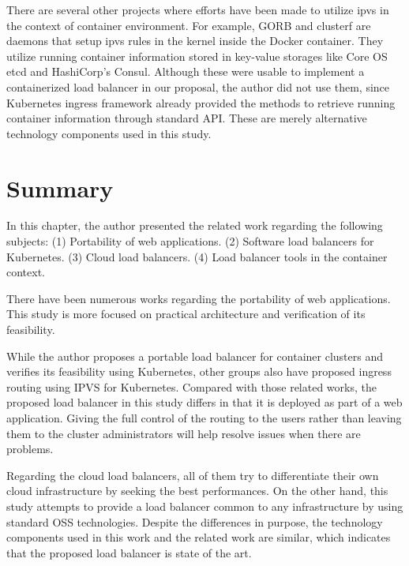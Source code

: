 There are several other projects where efforts have been made to utilize ipvs in the context of container environment.
For example, GORB\cite{Sibiryov2015} and clusterf\cite{Aaltodoc:http://urn.fi/URN:NBN:fi:aalto-201611025433} are daemons 
that setup ipvs rules in the kernel inside the Docker container. 
They utilize running container information stored in key-value storages
like Core OS etcd\cite{CoreOSEtcd} and HashiCorp's Consul\cite{HashiCorpConsul}. 
Although these were usable to implement a containerized load balancer in our proposal, the author did not use them,
since Kubernetes ingress framework already provided the methods to retrieve running container information through standard API.
These are merely alternative technology components used in this study.

\section{Summary}

In this chapter, the author presented the related work regarding the following subjects:
(1) Portability of web applications.
(2) Software load balancers for Kubernetes.
(3) Cloud load balancers.
(4) Load balancer tools in the container context.

There have been numerous works regarding the portability of web applications.
This study is more focused on practical architecture and verification of its feasibility.

While the author proposes a portable load balancer for container clusters and verifies its feasibility using Kubernetes, 
other groups also have proposed ingress routing using IPVS for Kubernetes.
Compared with those related works, the proposed load balancer in this study differs in that it is deployed as part of a web application.
Giving the full control of the routing to the users rather than leaving them to the cluster administrators will help resolve issues when there are problems.

Regarding the cloud load balancers, all of them try to differentiate their own cloud infrastructure by seeking the best performances.
On the other hand, this study attempts to provide a load balancer common to any infrastructure by using standard OSS technologies.
Despite the differences in purpose, the technology components used in this work and the related work are similar, which indicates that the proposed load balancer is state of the art.
